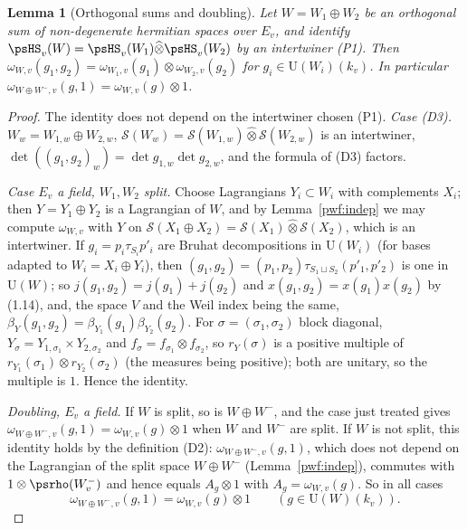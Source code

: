 \documentclass[10pt]{amsart}
\newtheorem{lemma}[theorem]{Lemma}
\theoremstyle{definition}
\theoremstyle{remark}
\providecommand{\auS}{\mathcal S}
\providecommand{\auU}{\mathrm U}
\begin{document}
\begin{lemma}[Orthogonal sums and doubling]\label{pwf:sum}
Let $W=W_1\oplus W_2$ be an orthogonal sum of non-degenerate hermitian spaces over $E_v$, and
identify $\psHS_v(W)=\psHS_v(W_1)\widehat\otimes\psHS_v(W_2)$ by an intertwiner (P1). Then
$\omega_{W,v}(g_1,g_2)=\omega_{W_1,v}(g_1)\otimes\omega_{W_2,v}(g_2)$ for $g_i\in\auU(W_i)(k_v)$. In
particular $\omega_{W\oplus W^-,v}(g,1)=\omega_{W,v}(g)\otimes1$.
\end{lemma}
\begin{proof}
The identity does not depend on the intertwiner chosen (P1). \emph{Case (D3).} $W_w=W_{1,w}\oplus
W_{2,w}$, $\auS(W_w)=\auS(W_{1,w})\widehat\otimes\auS(W_{2,w})$ is an intertwiner,
$\det((g_1,g_2)_w)=\det g_{1,w}\det g_{2,w}$, and the formula of (D3) factors.

\emph{Case $E_v$ a field, $W_1,W_2$ split.} Choose Lagrangians $Y_i\subset W_i$ with complements
$X_i$; then $Y=Y_1\oplus Y_2$ is a Lagrangian of $W$, and by Lemma~\ref{pwf:indep} we may compute
$\omega_{W,v}$ with $Y$ on $\auS(X_1\oplus X_2)=\auS(X_1)\widehat\otimes\auS(X_2)$, which is an
intertwiner. If $g_i=p_i\tau_{S_i}p'_i$ are Bruhat decompositions in $\auU(W_i)$ (for bases adapted
to $W_i=X_i\oplus Y_i$), then $(g_1,g_2)=(p_1,p_2)\tau_{S_1\sqcup S_2}(p'_1,p'_2)$ is one in
$\auU(W)$; so $j(g_1,g_2)=j(g_1)+j(g_2)$ and $x(g_1,g_2)=x(g_1)x(g_2)$ by (1.14), and, the space $V$
and the Weil index being the same, $\beta_Y(g_1,g_2)=\beta_{Y_1}(g_1)\beta_{Y_2}(g_2)$. For
$\sigma=(\sigma_1,\sigma_2)$ block diagonal, $Y_\sigma=Y_{1,\sigma_1}\times Y_{2,\sigma_2}$ and
$f_\sigma=f_{\sigma_1}\otimes f_{\sigma_2}$, so $r_Y(\sigma)$ is a positive multiple of
$r_{Y_1}(\sigma_1)\otimes r_{Y_2}(\sigma_2)$ (the measures being positive); both are unitary, so the
multiple is $1$. Hence the identity.

\emph{Doubling, $E_v$ a field.} If $W$ is split, so is $W\oplus W^-$, and the case just
treated gives $\omega_{W\oplus W^-,v}(g,1)=\omega_{W,v}(g)\otimes1$ when $W$ and $W^-$ are split.
If $W$ is not split, this identity holds by the definition (D2): $\omega_{W\oplus W^-,v}(g,1)$,
which does not depend on the Lagrangian of the split space $W\oplus W^-$ (Lemma~\ref{pwf:indep}),
commutes with $1\otimes\psrho(W^-_v)$ and hence equals $A_g\otimes1$ with $A_g=\omega_{W,v}(g)$.
So in all cases
\begin{equation}\label{pwf:eq-double}
\omega_{W\oplus W^-,v}(g,1)=\omega_{W,v}(g)\otimes1\qquad(g\in\auU(W)(k_v)).
\end{equation}


\end{proof}
\end{document}
